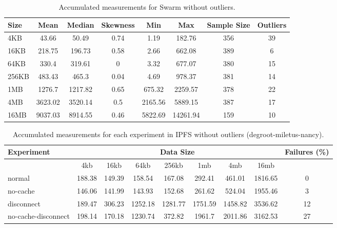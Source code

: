 \begin{table}[H]
\centering
\begin{small}
\caption{Accumulated measurements for Swarm without outliers.}
\begin{tabular}{@{}lccccccc@{}}
\toprule
Size & Mean & Median & Skewness & Min & Max & Sample Size & Outliers \\ \midrule
4KB & 43.66 & 50.49 & 0.74 & 1.19 & 182.76 & 356 & 39\\
16KB & 218.75 & 196.73 & 0.58 & 2.66 & 662.08 & 389 & 6\\
64KB & 330.4 & 319.61 & 0 & 3.32 & 677.07 & 380 & 15\\
256KB & 483.43 & 465.3 & 0.04 & 4.69 & 978.37 & 381 & 14\\
1MB & 1276.7 & 1217.82 & 0.65 & 675.32 & 2259.57 & 378 & 22\\
4MB & 3623.02 & 3520.14 & 0.5 & 2165.56 & 5889.15 & 387 & 17\\
16MB & 9037.03 & 8914.55 & 0.46 & 5822.69 & 14261.94 & 159 & 10\\
\bottomrule
\end{tabular}
\end{small}
\end{table}






\begin{table}[H]
\centering
\begin{small}
\caption{Accumulated measurements for each experiment in IPFS without outliers (degroot-miletus-nancy).}
\begin{tabular}{@{}lcccccccc@{}}
\toprule
Experiment    & \multicolumn{7}{c}{Data Size}          & Failures (\%) \\ \midrule
& 4kb  & 16kb  & 64kb  & 256kb  & 1mb  & 4mb  & 16mb              \\ \midrule
normal & 188.38 & 149.39 & 158.54 & 167.08 & 292.41 & 461.01 & 1816.65 & 0 \\
no-cache  & 146.06 & 141.99 & 143.93 & 152.68 & 261.62 & 524.04 & 1955.46 & 3 \\
disconnect  & 189.47 & 306.23 & 1252.18 & 1281.77 & 1751.59 & 1458.82 & 3536.62 & 12 \\
no-cache-disconnect  & 198.14 & 170.18 & 1230.74 & 372.82 & 1961.7 & 2011.86 & 3162.53 & 27 \\
\bottomrule
\end{tabular}
\end{small}
\end{table}


